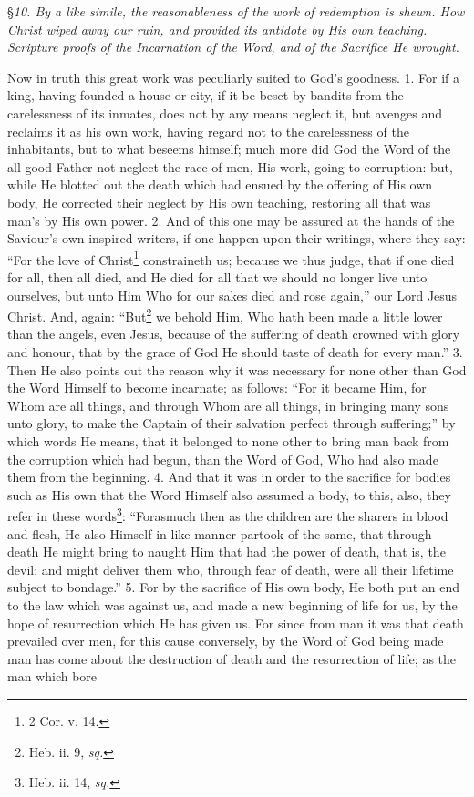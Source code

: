 
§\emph{10. By a like simile, the reasonableness of the work of redemption is shewn. How Christ wiped away our ruin, and provided its antidote by His own teaching. Scripture proofs of the Incarnation of the Word, and of the Sacrifice He wrought.}

Now in truth this great work was peculiarly suited to God’s goodness. 1. For if a king, having founded a house or city, if it be beset by bandits from the carelessness of its inmates, does not by any means neglect it, but avenges and reclaims it as his own work, having regard not to the carelessness of the inhabitants, but to what beseems himself; much more did God the Word of the all-good Father not neglect the race of men, His work, going to corruption: but, while He blotted out the death which had ensued by the offering of His own body, He corrected their neglect by His own teaching, restoring all that was man’s by His own power. 2. And of this one may be assured at the hands of the Saviour’s own inspired writers, if one happen upon their writings, where they say: “For the love of Christ\footnote{2 Cor. v. 14.} constraineth us; because we thus judge, that if one died for all, then all died, and He died for all that we should no longer live unto ourselves, but unto Him Who for our sakes died and rose again,” our Lord Jesus Christ. And, again: “But\footnote{Heb. ii. 9, \emph{sq.}} we behold Him, Who hath been made a little lower than the angels, even Jesus, because of the suffering of death crowned with glory and honour, that by the grace of God He should taste of death for every man.” 3. Then He also points out the reason why it was necessary for none other than God the Word Himself to become incarnate; as follows: “For it became Him, for Whom are all things, and through Whom are all things, in bringing many sons unto glory, to make the Captain of their salvation perfect through suffering;” by which words He means, that it belonged to none other to bring man back from the corruption which had begun, than the Word of God, Who had also made them from the beginning. 4. And that it was in order to the sacrifice for bodies such as His own that the Word Himself also assumed a body, to this, also, they refer in these words\footnote{Heb. ii. 14, \emph{sq.}}: “Forasmuch then as the children are the sharers in blood and flesh, He also Himself in like manner partook of the same, that through death He might bring to naught Him that had the power of death, that is, the devil; and might deliver them who, through fear of death, were all their lifetime subject to bondage.” 5. For by the sacrifice of His own body, He both put an end to the law which was against us, and made a new beginning of life for us, by the hope of resurrection which He has given us. For since from man it was that death prevailed over men, for this cause conversely, by the Word of God being made man has come about the destruction of death and the resurrection of life; as the man which bore 